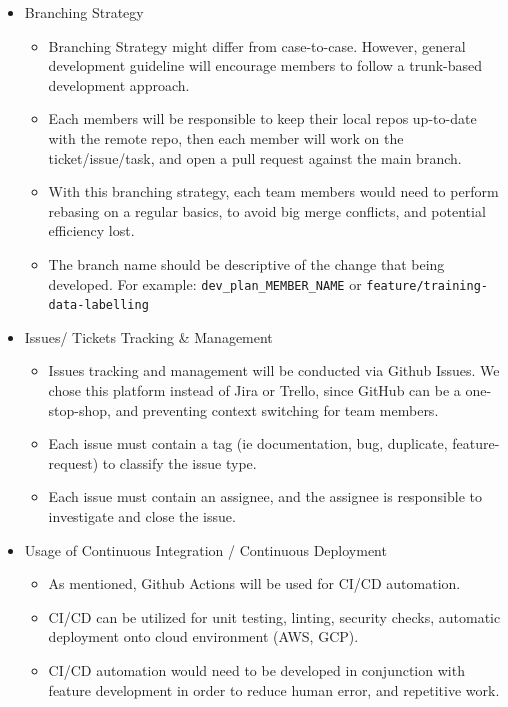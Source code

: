 \documentclass{article}
\begin{document}
\begin{itemize}
  \item Branching Strategy
  \begin{itemize}
    \item Branching Strategy might differ from case-to-case. However, general development guideline will encourage members to follow a trunk-based development approach.
    \item Each members will be responsible to keep their local repos up-to-date with the remote repo, then each member will work on the ticket/issue/task, and open a pull request against the main branch.
    \item With this branching strategy, each team members would need to perform rebasing on a regular basics, to avoid big merge conflicts, and potential efficiency lost. 
    \item The branch name should be descriptive of the change that being developed. For example: \texttt{dev\_plan\_MEMBER\_NAME} or \texttt{feature/training-data-labelling}

  \end{itemize}
	
	\item Issues/ Tickets Tracking \& Management
  \begin{itemize}
    \item Issues tracking and management will be conducted via Github Issues. We chose this platform instead of Jira or Trello, since GitHub can be a one-stop-shop, and preventing context switching for team members.
    \item Each issue must contain a tag (ie documentation, bug, duplicate, feature-request) to classify the issue type.
    \item Each issue must contain an assignee, and the assignee is responsible to investigate and close the issue.
  \end{itemize}

  \item Usage of Continuous Integration / Continuous Deployment
  \begin{itemize}
    \item As mentioned, Github Actions will be used for CI/CD automation.
    \item CI/CD can be utilized for unit testing, linting, security checks, automatic deployment onto cloud environment (AWS, GCP).
    \item CI/CD automation would need to be developed in conjunction with feature development in order to reduce human error, and repetitive work.
  \end{itemize}

\end{itemize}
\end{document}
